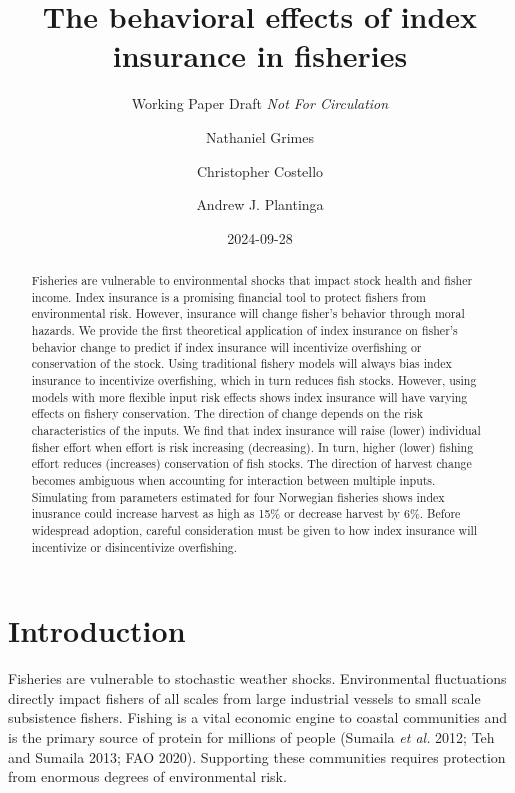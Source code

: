 \documentclass[
  letterpaper,
  DIV=11,
  numbers=noendperiod]{scrartcl}
\title{The behavioral effects of index insurance in fisheries}
\subtitle{Working Paper Draft \emph{Not For Circulation}}
\author{Nathaniel Grimes \and Christopher Costello \and Andrew J.
Plantinga}
\date{2024-09-28}
\renewcommand*\contentsname{Table of contents}
\newcommand\contentsname{Table of contents}
\theoremstyle{plain}
\theoremstyle{plain}
\theoremstyle{remark}
\begin{document}
\maketitle
\begin{abstract}
Fisheries are vulnerable to environmental shocks that impact stock
health and fisher income. Index insurance is a promising financial tool
to protect fishers from environmental risk. However, insurance will
change fisher's behavior through moral hazards. We provide the first
theoretical application of index insurance on fisher's behavior change
to predict if index insurance will incentivize overfishing or
conservation of the stock. Using traditional fishery models will always
bias index insurance to incentivize overfishing, which in turn reduces
fish stocks. However, using models with more flexible input risk effects
shows index insurance will have varying effects on fishery conservation.
The direction of change depends on the risk characteristics of the
inputs. We find that index insurance will raise (lower) individual
fisher effort when effort is risk increasing (decreasing). In turn,
higher (lower) fishing effort reduces (increases) conservation of fish
stocks. The direction of harvest change becomes ambiguous when
accounting for interaction between multiple inputs. Simulating from
parameters estimated for four Norwegian fisheries shows index inusrance
could increase harvest as high as 15\% or decrease harvest by 6\%.
Before widespread adoption, careful consideration must be given to how
index insurance will incentivize or disincentivize overfishing.
\end{abstract}
\ifdefined\Shaded\renewenvironment{Shaded}{\begin{tcolorbox}[breakable, enhanced, sharp corners, borderline west={3pt}{0pt}{shadecolor}, interior hidden, frame hidden, boxrule=0pt]}{\end{tcolorbox}}\fi

\renewcommand*\contentsname{Table of contents}
{
\hypersetup{linkcolor=}
\setcounter{tocdepth}{3}
\tableofcontents
}
\hypertarget{introduction}{%
\section{Introduction}\label{introduction}}

Fisheries are vulnerable to stochastic weather shocks. Environmental
fluctuations directly impact fishers of all scales from large industrial
vessels to small scale subsistence fishers. Fishing is a vital economic
engine to coastal communities and is the primary source of protein for
millions of people (Sumaila \emph{et al.} 2012; Teh and Sumaila 2013;
FAO 2020). Supporting these communities requires protection from
enormous degrees of environmental risk.
\end{document}

